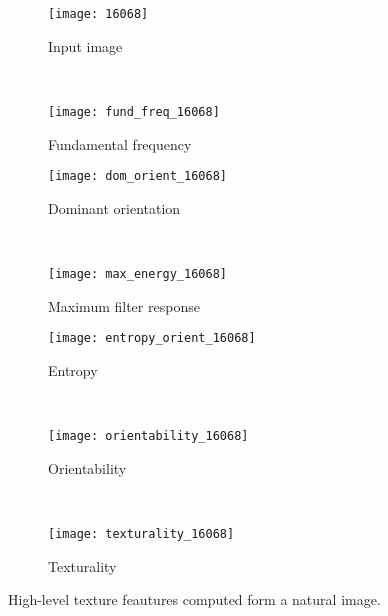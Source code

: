 \begin{figure}[!ht] 
	\centering
	\begin{subfigure}[b]{0.3\textwidth}
    	\texttt{[image: 16068]}
        \caption{Input image}
    \end{subfigure}\\[-0.5ex]
    \begin{subfigure}[b]{0.49\textwidth}
    	\texttt{[image: fund\_freq\_16068]}
        \caption{Fundamental frequency}
        \label{fig:fund_freq_16068}
    \end{subfigure}
    \begin{subfigure}[b]{0.49\textwidth}
    	\texttt{[image: dom\_orient\_16068]}
        \caption{Dominant orientation}
        \label{fig:dom_orient_16068}
    \end{subfigure}\\[-0.5ex]
    \begin{subfigure}[b]{0.49\textwidth}
    	\texttt{[image: max\_energy\_16068]}
        \caption{Maximum filter response}
        \label{fig:max_energy_16068}
    \end{subfigure}
    \begin{subfigure}[b]{0.49\textwidth}
    	\texttt{[image: entropy\_orient\_16068]}
        \caption{Entropy}
        \label{fig:entropy_orient_16068}
    \end{subfigure}\\[-0.5ex]
    \begin{subfigure}[b]{0.8\textwidth}
    	\texttt{[image: orientability\_16068]}
        \caption{Orientability}
        \label{fig:orientability_16068}
    \end{subfigure}\\[-0.5ex]
    \begin{subfigure}[b]{0.8\textwidth}
    	\texttt{[image: texturality\_16068]}
        \caption{Texturality}
        \label{fig:texturality_16068}
    \end{subfigure}    
                  
    \caption{High-level texture feautures computed form a natural image.}\label{fig:high_level_features_zebre}    
\end{figure}


